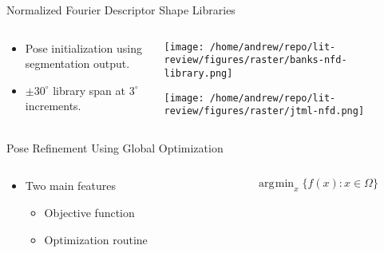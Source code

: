 \documentclass[presentation, aspectratio=1610]{beamer}
\DeclareMathOperator*{\argmin}{\arg\!min}
\begin{document}
\begin{frame}[label={sec:orgdbdd552}]{Normalized Fourier Descriptor Shape Libraries}
\begin{columns}
\begin{column}{0.37\columnwidth}
\begin{itemize}
\item Pose initialization using segmentation output.
\item \(\pm 30^{\circ}\) library span at \(3^{\circ}\) increments.
\end{itemize}
\end{column}

\begin{column}{0.7\columnwidth}
\begin{center}
\texttt{[image: /home/andrew/repo/lit-review/figures/raster/banks-nfd-library.png]}
\end{center}
\begin{center}
\texttt{[image: /home/andrew/repo/lit-review/figures/raster/jtml-nfd.png]}
\end{center}
\end{column}
\end{columns}
\end{frame}
\begin{frame}[label={sec:orgb8d0409}]{Pose Refinement Using Global Optimization}
\begin{columns}
\begin{column}{0.5\columnwidth}
\begin{itemize}
\item Two main features
\begin{itemize}
\item Objective function
\item Optimization routine
\end{itemize}
\end{itemize}
\end{column}
\begin{column}{0.5\columnwidth}
\begin{equation*}
    \argmin_{x}\{f(x) : x \in \Omega\}
\end{equation*}
\end{column}
\end{columns}
\end{frame}
\end{document}
